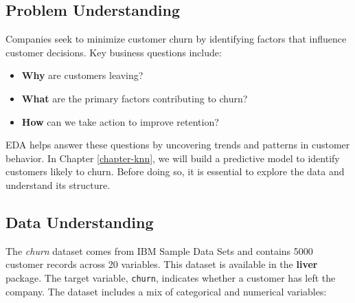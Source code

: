 \documentclass[
  11pt,
]{book}
\providecommand{\tightlist}{%
  \setlength{\itemsep}{0pt}\setlength{\parskip}{0pt}}
\theoremstyle{definition}
\theoremstyle{definition}
\theoremstyle{definition}
\theoremstyle{definition}
\theoremstyle{remark}
\begin{document}
\subsection*{Problem Understanding}\label{problem-understanding-1}


Companies seek to minimize customer churn by identifying factors that influence customer decisions. Key business questions include:

\begin{itemize}
\tightlist
\item
  \textbf{Why} are customers leaving?\\
\item
  \textbf{What} are the primary factors contributing to churn?\\
\item
  \textbf{How} can we take action to improve retention?
\end{itemize}

EDA helps answer these questions by uncovering trends and patterns in customer behavior. In Chapter \ref{chapter-knn}, we will build a predictive model to identify customers likely to churn. Before doing so, it is essential to explore the data and understand its structure.

\subsection*{Data Understanding}\label{data-understanding}


The \emph{churn} dataset comes from IBM Sample Data Sets and contains 5000 customer records across 20 variables. This dataset is available in the \textbf{liver} package. The target variable, \texttt{churn}, indicates whether a customer has left the company. The dataset includes a mix of categorical and numerical variables:
\end{document}
